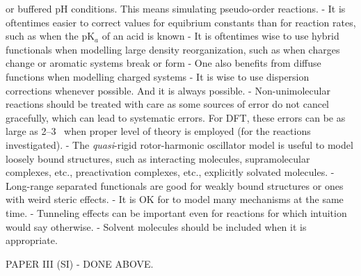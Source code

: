 or buffered pH conditions.
This means simulating pseudo-order reactions.
- It is oftentimes easier to correct values for equibrium constants than for reaction rates,
such as when the pK$_a$ of an acid is known
- It is oftentimes wise to use hybrid functionals when
modelling large density reorganization,
such as when charges change or
aromatic systems break or form
- One also benefits from diffuse functions when modelling charged systems
- It is wise to use dispersion corrections whenever possible.
And it is always possible.
- Non-unimolecular reactions should be treated with care
as some sources of error do not cancel gracefully,
which can lead to systematic errors.
For DFT,
these errors can be as large as 2--3~\kcalmol
when proper level of theory is employed (for the reactions investigated).
- The \emph{quasi}-rigid rotor-harmonic oscillator model
is useful to model loosely bound structures,
such as
interacting molecules,
supramolecular complexes,
etc.,
preactivation complexes,
etc.,
explicitly solvated molecules.
- Long-range separated functionals are good for weakly bound structures
or ones with weird steric effects.
- It is OK for \overreact{} to model many mechanisms at the same time.
- Tunneling effects can be important even for reactions for
which intuition would say otherwise.
- Solvent molecules should be included when it is appropriate.

PAPER III (SI)
- DONE ABOVE.\@

